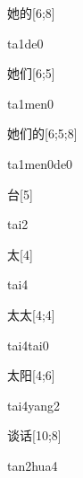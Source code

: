 \begin{verbete}[ta1de0]{她的}[6;8]
\begin{pronuncia}{ta1de0}
\end{pronuncia}
\end{verbete}

\begin{verbete}[ta1men0]{她们}[6;5]
\begin{pronuncia}{ta1men0}
\end{pronuncia}
\end{verbete}

\begin{verbete}[ta1men0de0]{她们的}[6;5;8]
\begin{pronuncia}{ta1men0de0}
\end{pronuncia}
\end{verbete}

\begin{verbete}[tai2]{台}[5]
\begin{pronuncia}{tai2}
\end{pronuncia}
\end{verbete}

\begin{verbete}[tai4]{太}[4]
\begin{pronuncia}{tai4}
\end{pronuncia}
\end{verbete}

\begin{verbete}{太太}[4;4]
\begin{pronuncia}{tai4tai0}
\end{pronuncia}
\end{verbete}

\begin{verbete}{太阳}[4;6]
\begin{pronuncia}{tai4yang2}
\end{pronuncia}
\end{verbete}

\begin{verbete}{谈话}[10;8]
\begin{pronuncia}{tan2hua4}
\end{pronuncia}
\end{verbete}

